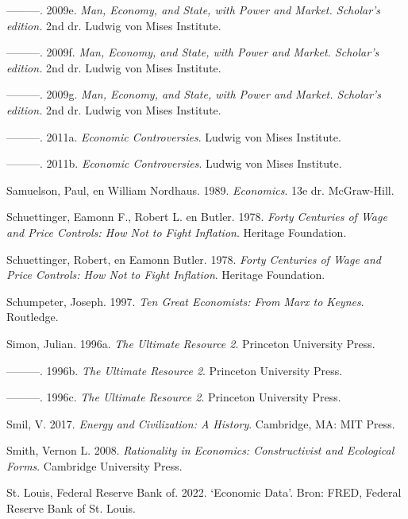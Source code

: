 \documentclass[
  a5paper,
  smalldemyvopaper,11pt,twoside,onecolumn,openright,extrafontsizes,
hidelinks]{memoir}
\newlength{\cslhangindent}
\newenvironment{CSLReferences}[2] %
 {\begin{list}{}{%
  \setlength{\itemindent}{0pt}
  \setlength{\leftmargin}{0pt}
  \setlength{\parsep}{0pt}
  \ifodd #1
   \setlength{\leftmargin}{\cslhangindent}
   \setlength{\itemindent}{-1\cslhangindent}
  \fi
  \setlength{\itemsep}{#2\baselineskip}}}
 {\end{list}}
\begin{document}
\begin{CSLReferences}{1}{0}
---------. 2009e. \emph{Man, Economy, and State, with Power and Market.
Scholar's edition.} 2nd dr. Ludwig von Mises Institute.

---------. 2009f. \emph{Man, Economy, and State, with Power and Market.
Scholar's edition.} 2nd dr. Ludwig von Mises Institute.

---------. 2009g. \emph{Man, Economy, and State, with Power and Market.
Scholar's edition.} 2nd dr. Ludwig von Mises Institute.

---------. 2011a. \emph{Economic Controversies}. Ludwig von Mises
Institute.

---------. 2011b. \emph{Economic Controversies}. Ludwig von Mises
Institute.

Samuelson, Paul, en William Nordhaus. 1989. \emph{Economics}. 13e dr.
McGraw-Hill.

Schuettinger, Eamonn F., Robert L. en Butler. 1978. \emph{Forty
Centuries of Wage and Price Controls: How Not to Fight Inflation}.
Heritage Foundation.

Schuettinger, Robert, en Eamonn Butler. 1978. \emph{Forty Centuries of
Wage and Price Controls: How Not to Fight Inflation}. Heritage
Foundation.

Schumpeter, Joseph. 1997. \emph{Ten Great Economists: From Marx to
Keynes}. Routledge.

Simon, Julian. 1996a. \emph{The Ultimate Resource 2}. Princeton
University Press.

---------. 1996b. \emph{The Ultimate Resource 2}. Princeton University
Press.

---------. 1996c. \emph{The Ultimate Resource 2}. Princeton University
Press.

Smil, V. 2017. \emph{Energy and Civilization: A History}. Cambridge, MA:
MIT Press.

Smith, Vernon L. 2008. \emph{Rationality in Economics: Constructivist
and Ecological Forms}. Cambridge University Press.

St. Louis, Federal Reserve Bank of. 2022. {`Economic Data'}. Bron: FRED,
Federal Reserve Bank of St. Louis.


\end{CSLReferences}
\end{document}
